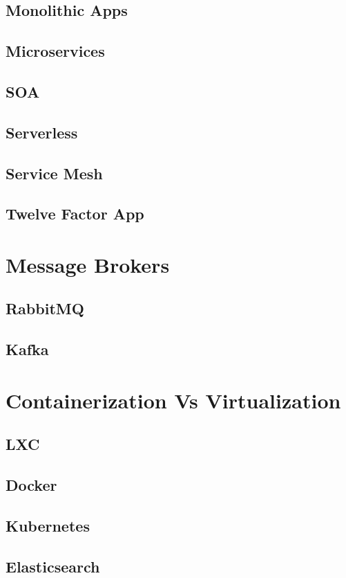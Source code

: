 \documentclass[a4paper]{article}
\begin{document}
    \subsection{Monolithic Apps}
    \subsection{Microservices}
    \subsection{SOA}
    \subsection{Serverless}
    \subsection{Service Mesh}
    \subsection{Twelve Factor App}

    \newpage
    \section{Message Brokers}
    \subsection{RabbitMQ}
    \subsection{Kafka}

    \newpage
    \section{Containerization Vs Virtualization} 
    \subsection{LXC}
    \subsection{Docker}
    \subsection{Kubernetes}
    \subsection{Elasticsearch}
\end{document}
